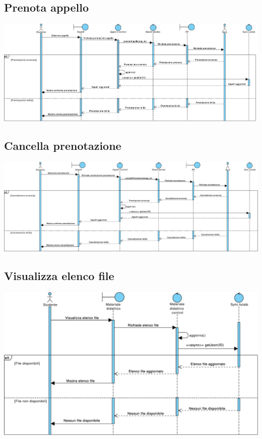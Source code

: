 \subsection{Prenota appello}
\begin{center}
	\includegraphics[width=6.5in]{imgs/gruppo1/sequence_diagrams/SD11_prenota_appello.pdf}
\end{center}
\subsection{Cancella prenotazione}
\begin{center}
	\includegraphics[width=6.5in]{imgs/gruppo1/sequence_diagrams/SD12_cancella_prenotazione.pdf}
\end{center}
\newpage


\subsection{Visualizza elenco file}
\begin{center}
	\includegraphics[width=6.5in]{imgs/gruppo1/sequence_diagrams/SD13_visualizza_elenco_file.pdf}
\end{center}
